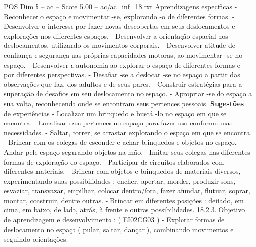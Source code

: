 \begin{textsample}{POS Dim 5 – ac – Score 5.00 – ac/ac\_inf\_18.txt}
Aprendizagens específicas - Reconhecer o espaço e movimentar -se, explorando -o de diferentes formas. - Desenvolver o interesse por fazer novas descobertas em seus deslocamentos e explorações nos diferentes espaços. - Desenvolver a orientação espacial nos deslocamentos, utilizando os movimentos corporais. - Desenvolver atitude de confiança e segurança nas próprias capacidades motoras, ao movimentar -se no espaço. - Desenvolver a autonomia ao explorar o espaço de diferentes formas e por diferentes perspectivas. - Desafiar -se a deslocar -se no espaço a partir das observações que faz, dos adultos e de seus pares. - Construir estratégias para a superação de desafios em seu deslocamento no espaço. - Apropriar -se do espaço a sua volta, reconhecendo onde se encontram seus pertences pessoais. \textbf{Sugestões} de experiências - Localizar um brinquedo e buscá -lo no espaço em que se encontra. - Localizar seus pertences no espaço para fazer uso conforme suas necessidades. - Saltar, correr, se arrastar explorando o espaço em que se encontra. - Brincar com os colegas de esconder e achar brinquedos e objetos no espaço. - Andar pelo espaço segurando objetos na mão. - Imitar seus colegas nas diferentes formas de exploração do espaço. - Participar de circuitos elaborados com diferentes materiais. - Brincar com objetos e brinquedos de materiais diversos, experimentando suas possibilidades : encher, apertar, morder, produzir sons, esvaziar, transvazar, empilhar, colocar dentro/fora, fazer afundar, flutuar, soprar, montar, construir, dentre outras. - Brincar em diferentes posições : deitado, em cima, em baixo, de lado, atrás, à frente e outras possibilidades. 18.2.3.
Objetivo de aprendizagem e desenvolvimento : ( EI02CG03 ) - Explorar formas de deslocamento no espaço ( pular, saltar, dançar ), combinando movimentos e seguindo orientações.

\end{textsample}

